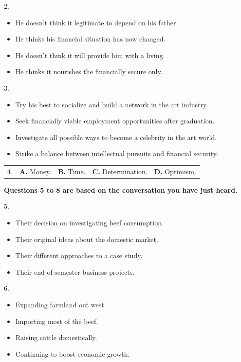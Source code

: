 \documentclass[UTF8,11pt]{ctexart}
\begin{document}
2.


\begin{itemize}[leftmargin=2em,itemsep=.2em,topsep=.4em]\item[A.] He doesn’t think it legitimate to depend on his father.
\item[B.] He thinks his financial situation has now changed.
\item[C.] He doesn’t think it will provide him with a living.
\item[D.] He thinks it nourishes the financially secure only.
\end{itemize}

3.


\begin{itemize}[leftmargin=2em,itemsep=.2em,topsep=.4em]\item[A.] Try his best to socialize and build a network in the art industry.
\item[B.] Seek financially viable employment opportunities after graduation.
\item[C.] Investigate all possible ways to become a celebrity in the art world.
\item[D.] Strike a balance between intellectual pursuits and financial security.
\end{itemize}

\noindent\begin{tabularx}{\linewidth}{@{}lXXXX@{}}4. & \textbf{A.} Money. & \textbf{B.} Time. & \textbf{C.} Determination. & \textbf{D.} Optimism.\\\end{tabularx}\par

\textbf{Questions 5 to 8 are based on the conversation you have just heard.}


5.


\begin{itemize}[leftmargin=2em,itemsep=.2em,topsep=.4em]\item[A.] Their decision on investigating beef consumption.
\item[B.] Their original ideas about the domestic market.
\item[C.] Their different approaches to a case study.
\item[D.] Their end-of-semester business projects.
\end{itemize}

6.


\begin{itemize}[leftmargin=2em,itemsep=.2em,topsep=.4em]\item[A.] Expanding farmland out west.
\item[B.] Importing most of the beef.
\item[C.] Raising cattle domestically.
\item[D.] Continuing to boost economic growth.
\end{itemize}
\end{document}
